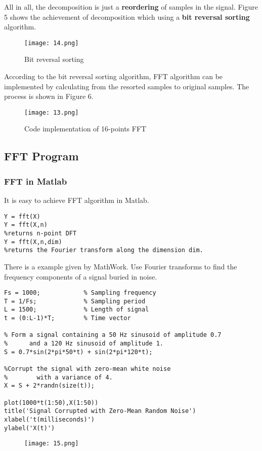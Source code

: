 \documentclass[12pt,a4paper]{article}
\begin{document}
All in all, the decomposition is just a \textbf{reordering} of samples in the signal. Figure 5 shows the achievement of decomposition which using a \textbf{bit reversal sorting} algorithm. 
\begin{figure}[hbtp]
\centering
\texttt{[image: 14.png]}
\caption{Bit reversal sorting}
\end{figure}
\newpage


According to the bit reversal sorting algorithm, FFT algorithm can be implemented by calculating from the resorted samples to original samples. The process is shown in Figure 6.
\begin{figure}[hbtp]
\centering
\texttt{[image: 13.png]}
\caption{Code implementation of 16-points FFT}
\end{figure}

\newpage
\subsection{FFT Program}
\subsubsection{FFT in Matlab}
It is easy to achieve FFT algorithm in Matlab.
\lstset{language=Matlab}
\begin{lstlisting}
Y = fft(X)
Y = fft(X,n)      
%returns n-point DFT  
Y = fft(X,n,dim)  
%returns the Fourier transform along the dimension dim.
\end{lstlisting}

There is a example given by MathWork. Use Fourier transforms to find the frequency components of a signal buried in noise.
\lstset{language=Matlab}
\begin{lstlisting}
Fs = 1000;            % Sampling frequency                    
T = 1/Fs;             % Sampling period       
L = 1500;             % Length of signal
t = (0:L-1)*T;        % Time vector

% Form a signal containing a 50 Hz sinusoid of amplitude 0.7 
%      and a 120 Hz sinusoid of amplitude 1.
S = 0.7*sin(2*pi*50*t) + sin(2*pi*120*t);

%Corrupt the signal with zero-mean white noise 
%        with a variance of 4.
X = S + 2*randn(size(t));

plot(1000*t(1:50),X(1:50))
title('Signal Corrupted with Zero-Mean Random Noise')
xlabel('t(milliseconds)')
ylabel('X(t)')
\end{lstlisting}

\begin{figure}[hbtp]
\centering
\texttt{[image: 15.png]}
\end{figure}
\end{document}
